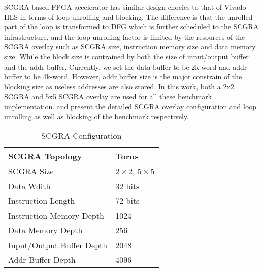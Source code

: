 SCGRA based FPGA accelerator has similar design chocies to that of Vivado HLS in terms of loop unrolling and blocking. The difference is that the unrolled part of the loop is transformed to DFG which is further scheduled to the SCGRA infrastructure, and the loop unrolling factor is limited by the resources of the SCGRA overlay such as SCGRA size, instruction memory size and data memory size. While the block size is contrained by both the size of input/output buffer and the addr buffer. Currently, we set the data buffer to be 2k-word and addr buffer to be 4k-word. However, addr buffer size is the major constrain of the blocking size as useless addresses are also stored. In this work, both a 2x2 SCGRA and 5x5 SCGRA overlay are used for all these benchmark implementation.  and  present the detailed SCGRA overlay configuration and loop unrolling as well as blocking of the benchmark respectively.

\begin{table}[h]
\caption{SCGRA Configuration}
\label{tab:scgra-config}
\centering
\begin{tabular}{|l|l|}

\hline
{SCGRA Topology} & {Torus} \\ \hline
{SCGRA Size} & {$2 \times 2$, $5 \times 5$} \\ \hline
{Data Wdith} & {32 bits} \\ \hline
{Instruction Length} & {72 bits} \\ \hline
{Instruction Memory Depth} & {1024} \\ \hline
{Data Memory Depth} & {256} \\ \hline
{Input/Output Buffer Depth} & {2048} \\ \hline
{Addr Buffer Depth} & {4096} \\ \hline

\end{tabular}
\end{table}

